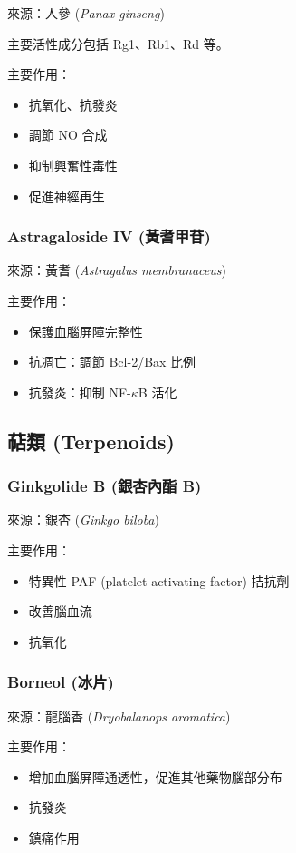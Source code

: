 \documentclass[12pt,a4paper]{article}
\begin{document}
來源：人參 (\textit{Panax ginseng})

主要活性成分包括 Rg1、Rb1、Rd 等。

主要作用：
\begin{itemize}
    \item 抗氧化、抗發炎
    \item 調節 NO 合成
    \item 抑制興奮性毒性
    \item 促進神經再生
\end{itemize}

\subsubsection{Astragaloside IV (黃耆甲苷)}

來源：黃耆 (\textit{Astragalus membranaceus})

主要作用：
\begin{itemize}
    \item 保護血腦屏障完整性
    \item 抗凋亡：調節 Bcl-2/Bax 比例
    \item 抗發炎：抑制 NF-$\kappa$B 活化
\end{itemize}

\subsection{萜類 (Terpenoids)}

\subsubsection{Ginkgolide B (銀杏內酯 B)}

來源：銀杏 (\textit{Ginkgo biloba})

主要作用：
\begin{itemize}
    \item 特異性 PAF (platelet-activating factor) 拮抗劑
    \item 改善腦血流
    \item 抗氧化
\end{itemize}

\subsubsection{Borneol (冰片)}

來源：龍腦香 (\textit{Dryobalanops aromatica})

主要作用：
\begin{itemize}
    \item 增加血腦屏障通透性，促進其他藥物腦部分布
    \item 抗發炎
    \item 鎮痛作用
\end{itemize}
\end{document}
